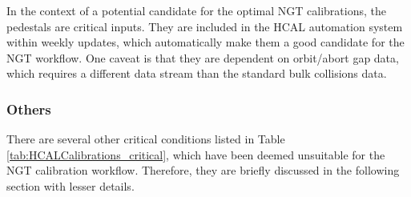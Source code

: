 In the context of a potential candidate for the optimal NGT calibrations, the pedestals are critical inputs. They are included in the HCAL automation system within weekly updates, which automatically make them a good candidate for the NGT workflow. One caveat is that they are dependent on orbit/abort gap data, which requires a different data stream than the standard bulk collisions data.

\subsubsection{Others}

There are several other critical conditions listed in Table \ref{tab:HCALCalibrations_critical}, which have been deemed unsuitable for the NGT calibration workflow. Therefore, they are briefly discussed in the following section with lesser details.

